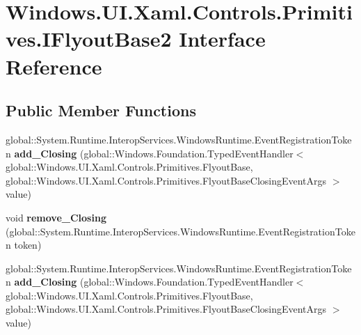 \hypertarget{interface_windows_1_1_u_i_1_1_xaml_1_1_controls_1_1_primitives_1_1_i_flyout_base2}{}\section{Windows.\+U\+I.\+Xaml.\+Controls.\+Primitives.\+I\+Flyout\+Base2 Interface Reference}
\label{interface_windows_1_1_u_i_1_1_xaml_1_1_controls_1_1_primitives_1_1_i_flyout_base2}
\subsection*{Public Member Functions}
\begin{DoxyCompactItemize}
\item 
\mbox{\label{interface_windows_1_1_u_i_1_1_xaml_1_1_controls_1_1_primitives_1_1_i_flyout_base2_a95eddb9c9237f55550e710d800416b2d}} 
global\+::\+System.\+Runtime.\+Interop\+Services.\+Windows\+Runtime.\+Event\+Registration\+Token {\bfseries add\+\_\+\+Closing} (global\+::\+Windows.\+Foundation.\+Typed\+Event\+Handler$<$ global\+::\+Windows.\+U\+I.\+Xaml.\+Controls.\+Primitives.\+Flyout\+Base, global\+::\+Windows.\+U\+I.\+Xaml.\+Controls.\+Primitives.\+Flyout\+Base\+Closing\+Event\+Args $>$ value)
\item 
\mbox{\label{interface_windows_1_1_u_i_1_1_xaml_1_1_controls_1_1_primitives_1_1_i_flyout_base2_a77bb61b674028f7f98f003b0694b180e}} 
void {\bfseries remove\+\_\+\+Closing} (global\+::\+System.\+Runtime.\+Interop\+Services.\+Windows\+Runtime.\+Event\+Registration\+Token token)
\item 
\mbox{\label{interface_windows_1_1_u_i_1_1_xaml_1_1_controls_1_1_primitives_1_1_i_flyout_base2_a95eddb9c9237f55550e710d800416b2d}} 
global\+::\+System.\+Runtime.\+Interop\+Services.\+Windows\+Runtime.\+Event\+Registration\+Token {\bfseries add\+\_\+\+Closing} (global\+::\+Windows.\+Foundation.\+Typed\+Event\+Handler$<$ global\+::\+Windows.\+U\+I.\+Xaml.\+Controls.\+Primitives.\+Flyout\+Base, global\+::\+Windows.\+U\+I.\+Xaml.\+Controls.\+Primitives.\+Flyout\+Base\+Closing\+Event\+Args $>$ value)

\end{DoxyCompactItemize}
